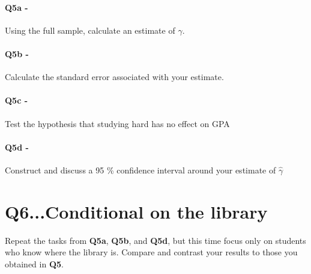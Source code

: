 \documentclass[12pt]{article}		%
\begin{document}
\clearpage

\paragraph*{Q5a -} Using the full sample, calculate an estimate of $\hat{\gamma}$.

\vspace{2cm}

\paragraph*{Q5b -} Calculate the standard error associated with your estimate.

\vspace{2cm}

\paragraph*{Q5c -} Test the hypothesis that studying hard has no effect on GPA

\vspace{2cm}

\paragraph*{Q5d -} Construct and discuss a 95 \% confidence interval around your estimate of $\hat{\gamma}$


\clearpage

\vspace{2cm}

\section*{Q6...Conditional on the library}

Repeat the tasks from \textbf{Q5a}, \textbf{Q5b}, and \textbf{Q5d}, but this time focus only on students who know where the library is. Compare and contrast your results to those you obtained in \textbf{Q5}.
\end{document}
